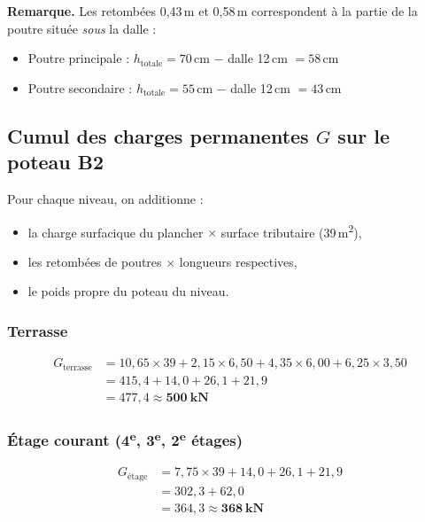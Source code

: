 \textbf{Remarque.} Les retombées 0,43\,m et 0,58\,m correspondent à la partie de la poutre située \emph{sous} la dalle :
\begin{itemize}
  \item Poutre principale : $h_\text{totale} = 70$\,cm $-$ dalle 12\,cm $= 58$\,cm
  \item Poutre secondaire : $h_\text{totale} = 55$\,cm $-$ dalle 12\,cm $= 43$\,cm
\end{itemize}

\subsection{Cumul des charges permanentes \texorpdfstring{$G$}{G} sur le poteau B2}

Pour chaque niveau, on additionne :
\begin{itemize}
  \item la charge surfacique du plancher $\times$ surface tributaire (39\,m\textsuperscript{2}),
  \item les retombées de poutres $\times$ longueurs respectives,
  \item le poids propre du poteau du niveau.
\end{itemize}

\subsubsection{Terrasse}
\[
\begin{aligned}
  G_\text{terrasse} &= 10{,}65 \times 39 + 2{,}15 \times 6{,}50 + 4{,}35 \times 6{,}00 + 6{,}25 \times 3{,}50 \\
                    &= 415{,}4 + 14{,}0 + 26{,}1 + 21{,}9 \\
                    &= 477{,}4 \approx \mathbf{500~\text{kN}}
\end{aligned}
\]

\subsubsection{Étage courant (4\texorpdfstring{\textsuperscript{e}}{e}, 3\texorpdfstring{\textsuperscript{e}}{e}, 2\texorpdfstring{\textsuperscript{e}}{e} étages)}
\[
\begin{aligned}
  G_\text{étage} &= 7{,}75 \times 39 + 14{,}0 + 26{,}1 + 21{,}9 \\
                 &= 302{,}3 + 62{,}0 \\
                 &= 364{,}3 \approx \mathbf{368~\text{kN}}
\end{aligned}
\]

